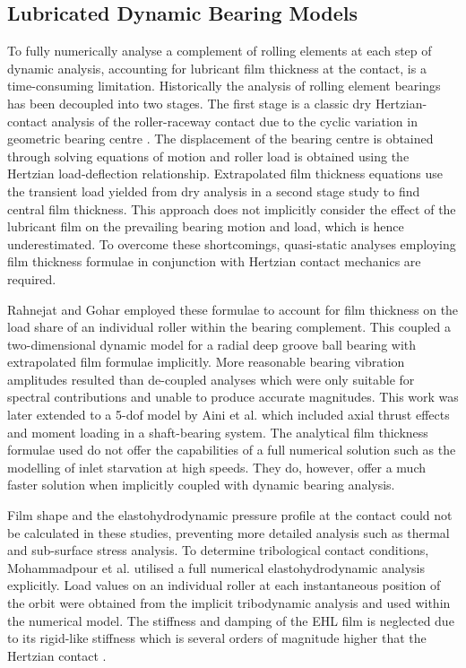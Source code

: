 \subsection{Lubricated Dynamic Bearing Models}

To fully numerically analyse a complement of rolling elements at each step of dynamic analysis, accounting for lubricant film thickness at the contact, is a time-consuming limitation. Historically the analysis of rolling element bearings has been decoupled into two stages. The first stage is a classic dry Hertzian-contact analysis of the roller-raceway contact due to the cyclic variation in geometric bearing centre \cite{Aini1990}. The displacement of the bearing centre is obtained through solving equations of motion and roller load is obtained using the Hertzian load-deflection relationship. Extrapolated film thickness equations use the transient load yielded from dry analysis in a second stage study to find central film thickness. This approach does not implicitly consider the effect of the lubricant film on the prevailing bearing motion and load, which is hence underestimated. To overcome these shortcomings, quasi-static analyses employing film thickness formulae in conjunction with Hertzian contact mechanics are required.

Rahnejat and Gohar \cite{Rahnejat1985} employed these formulae to account for film thickness on the load share of an individual roller within the bearing complement. This coupled a two-dimensional dynamic model for a radial deep groove ball bearing with extrapolated film formulae implicitly. More reasonable bearing vibration amplitudes resulted than de-coupled analyses which were only suitable for spectral contributions and unable to produce accurate magnitudes. This work was later extended to a 5-dof model by Aini et al. \cite{Aini2002} which included axial thrust effects and moment loading in a shaft-bearing system. The analytical film thickness formulae used do not offer the capabilities of a full numerical solution such as the modelling of inlet starvation at high speeds. They do, however, offer a much faster solution when implicitly coupled with dynamic bearing analysis.

Film shape and the elastohydrodynamic pressure profile at the contact could not be calculated in these studies, preventing more detailed analysis such as thermal and sub-surface stress analysis. To determine tribological contact conditions, Mohammadpour et al. \cite{Mohammadpour2015c} utilised a full numerical elastohydrodynamic analysis explicitly. Load values on an individual roller at each instantaneous position of the orbit were obtained from the implicit tribodynamic analysis and used within the numerical model. The stiffness and damping of the EHL film is neglected due to its rigid-like stiffness which is several orders of magnitude higher that the Hertzian contact \cite{Dareing1975} \cite{Mehdigoli1990}. 

